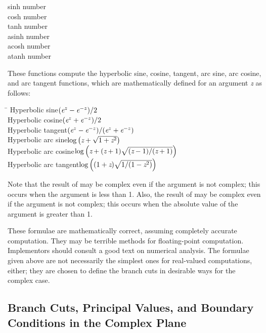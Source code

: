 \relax

\begin{defun}[Function]
sinh number \\
cosh number \\
tanh number \\
asinh number \\
acosh number \\
atanh number

These functions compute the hyperbolic sine, cosine, tangent,
arc sine, arc cosine, and arc tangent functions, which are mathematically
defined for an argument \emph{z} as follows:

\begin{tabbing}
\hskip 10pc\=\kill
Hyperbolic sine\>$ (\emph{e}^{z}-\emph{e}^{-z})/2 $ \\
Hyperbolic cosine\>$ (\emph{e}^{z}+\emph{e}^{-z})/2 $ \\
Hyperbolic tangent\>$ (\emph{e}^{z}-\emph{e}^{-z})/(\emph{e}^{z}+\emph{e}^{-z}) $ \\[2pt]
Hyperbolic arc sine\>$ \log \left(\emph{z}+\sqrt{1+\emph{z}^2}\right) $ \\[2pt]
Hyperbolic arc cosine\>$ \log
\left(\emph{z}+(\emph{z}+1)\sqrt{(\emph{z}-1)/(\emph{z}+1)}\right) $ \\[2pt]
Hyperbolic arc tangent\>$ \log \left((1+\emph{z})\sqrt{1/(1-\emph{z}^2)}\right) $
\end{tabbing}

Note that the result of  may be
complex even if the argument is not complex; this occurs
when the argument is less than 1.
Also, the result of  may be
complex even if the argument is not complex; this occurs
when the absolute value of the argument is greater than 1.

\beforenoterule
\begin{implementation}
These formulae are mathematically correct, assuming
completely accurate computation.  They may be terrible methods for
floating-point computation.  Implementors should consult a good text on
numerical analysis.  The formulae given above are not necessarily
the simplest ones for real-valued computations, either; they are chosen
to define the branch cuts in desirable ways for the complex case.
\end{implementation}
\afternoterule
\end{defun}

\subsection{Branch Cuts, Principal Values, and Boundary Conditions in the Complex Plane}
\label{BRANCH-CUTS-SECTION}


